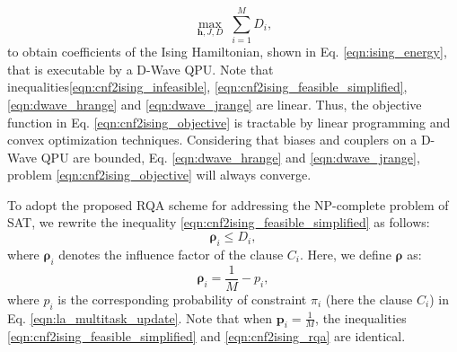 \documentclass[fleqn,10pt]{wlscirep}
\begin{document}
\begin{equation}
	\label{eqn:cnf2ising_objective}
	\max_{\mathbf{h}, J, D} \; {\sum_{i=1}^{M}{D_i}},
\end{equation}
to obtain coefficients of the Ising Hamiltonian, shown in Eq. \eqref{eqn:ising_energy}, that is executable by a D-Wave QPU. Note that inequalities\eqref{eqn:cnf2ising_infeasible}, \eqref{eqn:cnf2ising_feasible_simplified}, \eqref{eqn:dwave_hrange} and \eqref{eqn:dwave_jrange} are linear. Thus, the objective function in Eq. \eqref{eqn:cnf2ising_objective} is tractable by linear programming and convex optimization techniques. Considering that biases and couplers on a D-Wave QPU are bounded, Eq. \eqref{eqn:dwave_hrange} and \eqref{eqn:dwave_jrange}, problem \eqref{eqn:cnf2ising_objective} will always converge. 

To adopt the proposed RQA scheme for addressing the NP-complete problem of SAT, we rewrite the inequality \eqref{eqn:cnf2ising_feasible_simplified} as follows:
\begin{equation}
	\label{eqn:cnf2ising_rqa}
	\boldsymbol{\rho}_i  \leq D_i,
\end{equation}
where $\boldsymbol{\rho}_i$ denotes the influence factor of the clause $C_i$. Here, we define $\boldsymbol{\rho}$ as:
\begin{equation}
	\label{eqn:cnf2ising_rqa_rho}
	\boldsymbol{\rho}_i = \frac{1}{M}-p_i,
\end{equation}
where $p_i$ is the corresponding probability of constraint $\pi_i$ (here the clause $C_i$) in Eq. \eqref{eqn:la_multitask_update}. Note that when $\boldsymbol{p}_i = \frac{1}{M}$,  the inequalities \eqref{eqn:cnf2ising_feasible_simplified} and \eqref{eqn:cnf2ising_rqa} are identical. 
\end{document}
